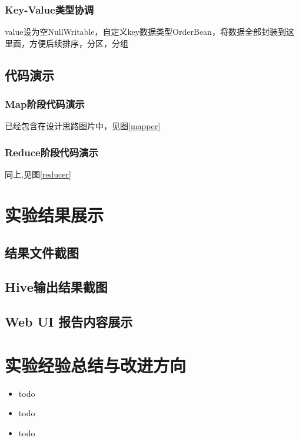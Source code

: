 \documentclass[a4paper,UTF8]{article}
\numberwithin{equation}{section}
\begin{document}
\subsubsection{Key-Value类型协调}
value设为空NullWritable，自定义key数据类型OrderBean，将数据全部封装到这里面，方便后续排序，分区，分组
\subsection{代码演示}
\subsubsection{Map阶段代码演示}
已经包含在设计思路图片中，见图\ref{mapper}

\subsubsection{Reduce阶段代码演示}
同上,见图\ref{reducer}
\section{实验结果展示}
\subsection{结果文件截图}

\subsection{Hive输出结果截图}

\subsection{Web UI 报告内容展示}

\section{实验经验总结与改进方向}
\begin{itemize}
	\item todo
	\item todo
	\item todo
\end{itemize}

    
    
\end{document}
